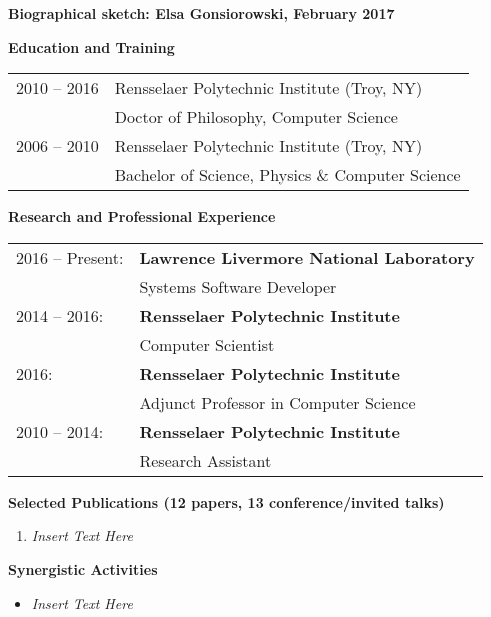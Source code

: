 \documentclass[times,11pt]{article}    %
\begin{document}
\begin{center}
\textbf{\sffamily\large Biographical sketch: Elsa Gonsiorowski, February 2017}
\end{center}

\vskip 3pt
\textbf{\sffamily Education and Training}
\vskip 3pt

\begin{tabular}{ll}
\\
2010 -- 2016 & Rensselaer Polytechnic Institute (Troy, NY)\\
             & Doctor of Philosophy, Computer Science\\
2006 -- 2010 & Rensselaer Polytechnic Institute (Troy, NY)\\
             & Bachelor of Science, Physics \& Computer Science\\
\end{tabular}

\vskip 3pt
\textbf{\sffamily Research and Professional Experience}
\vskip 3pt

\begin{tabular}{ll}
2016 -- Present: & 
\textbf{Lawrence Livermore National Laboratory}\\
 & Systems Software Developer \\

2014 -- 2016: &
\textbf{Rensselaer Polytechnic Institute}\\
 & Computer Scientist \\

2016: & 
\textbf{Rensselaer Polytechnic Institute}\\
 & Adjunct Professor in Computer Science \\

2010 -- 2014: & 
\textbf{Rensselaer Polytechnic Institute}\\
 & Research Assistant \\
\end{tabular}

\vskip 3pt
\textbf{\sffamily Selected Publications (12 papers, 13 conference/invited talks)}

\begin{enumerate}
\item {\em Insert Text Here}
\end{enumerate}

\vskip 3pt
\textbf{\sffamily Synergistic Activities}

\begin{itemize}
\item {\em Insert Text Here}
\end{itemize}
\end{document}
